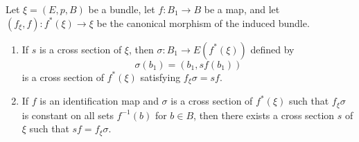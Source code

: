 Let $\xi = (E, p, B)$ be a bundle, let $f: B_1 \to B$ be a map, and let $(f_\xi, f): f^*(\xi) \to \xi$ be the canonical morphism of the induced bundle.

\begin{enumerate}
\item If $s$ is a cross section of $\xi$, then $\sigma: B_1 \to E(f^*(\xi))$ defined by
$$\sigma(b_1) = (b_1, sf(b_1))$$
is a cross section of $f^*(\xi)$ satisfying $f_\xi \sigma = sf$.

\item If $f$ is an identification map and $\sigma$ is a cross section of $f^*(\xi)$ such that $f_\xi \sigma$ is constant on all sets $f^{-1}(b)$ for $b \in B$, then there exists a cross section $s$ of $\xi$ such that $sf = f_\xi \sigma$.
\end{enumerate}
